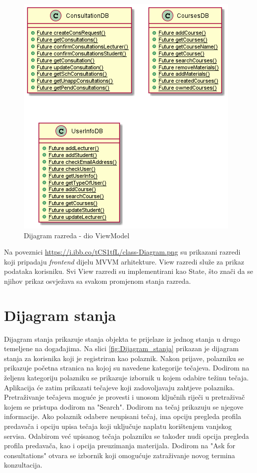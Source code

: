 			
			\begin{figure}[h]
				\includegraphics[scale=0.8]{dijagrami/ViewModel.PNG}
				\centering
				\caption{Dijagram razreda - dio ViewModel}
				\label{fig:ViewModel}
			\end{figure}
			
			Na poveznici \url{https://i.ibb.co/tCS1tfL/class-Diagram.png} su prikazani razredi koji pripadaju \textit{frontend} dijelu MVVM arhitekture. View razredi služe za prikaz podataka korisniku. Svi View razredi su implementirani kao State, što znači da se njihov prikaz osvježava sa svakom promjenom stanja razreda.
			
			
			\eject
			
		\section{Dijagram stanja}
			
			
			Dijagram stanja prikazuje stanja objekta te prijelaze iz jednog stanja u drugo temeljene na događajima. Na slici \ref{fig:Dijagram_stanja} prikazan je dijagram stanja za korisnika koji je registriran kao polaznik. Nakon prijave, polazniku se prikazuje početna stranica na kojoj su navedene kategorije tečajeva. Dodirom na željenu kategoriju polazniku se prikazuje izbornik u kojem odabire težinu tečaja. Aplikacija će zatim prikazati tečajeve koji zadovoljavaju zahtjeve polaznika. Pretraživanje tečajeva moguće je provesti i unosom ključnih riječi u pretraživač kojem se pristupa dodirom na "Search". Dodirom na tečaj prikazuju se njegove informacije. Ako polaznik odabere neupisani tečaj, ima opciju pregleda profila predavača i opciju upisa tečaja koji uključuje naplatu korištenjem vanjskog servisa. Odabirom već upisanog tečaja polazniku se također nudi opcija pregleda profila predavača, kao i opcija preuzimanja materijala. Dodirom na "Ask for consultations" otvara se izbornik koji omogućuje zatraživanje novog termina konzultacija.
			
